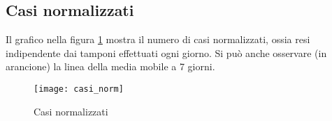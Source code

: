 \subsection{Casi normalizzati}
Il grafico nella figura \ref{fig:casi_normalizzati} mostra il numero di casi normalizzati, ossia resi indipendente dai tamponi effettuati ogni giorno.
Si può anche osservare (in arancione) la linea della media mobile a 7 giorni.
\begin{figure}[htp]
    \centering
    \texttt{[image: casi\_norm]}
    \caption{Casi normalizzati}
    \label{fig:casi_normalizzati}
\end{figure}




